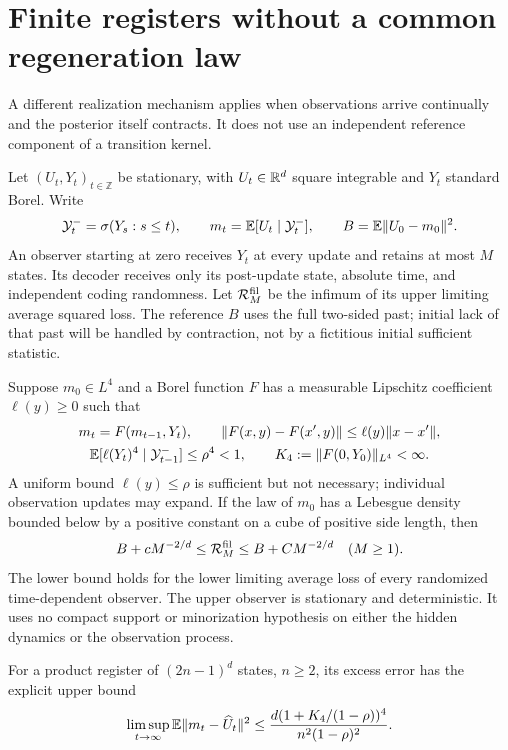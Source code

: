 \section{Finite registers without a common regeneration law}
\label{sec:v6-filter}
A different realization mechanism applies when observations arrive
continually and the posterior itself contracts. It does not use an
independent reference component of a transition kernel.

Let $(U_t,Y_t)_{t\in\mathbb Z}$ be stationary, with $U_t\in\mathbb R^d$ square
integrable and $Y_t$ standard Borel. Write
\[
 \mathcal Y_t^- =\sigma(Y_s:s\le t),\qquad
 m_t=\mathbb E[U_t\mid\mathcal Y_t^-],\qquad
 B=\mathbb E\|U_0-m_0\|^2.
\]
An observer starting at zero receives $Y_t$ at every update and retains
at most $M$ states. Its decoder receives only its post-update state,
absolute time, and independent coding randomness. Let
$\mathcal R_M^{\rm fil}$ be the infimum of its upper limiting average
squared loss. The reference $B$ uses the full two-sided past; initial
lack of that past will be handled by contraction, not by a fictitious
initial sufficient statistic.

\begin{theorem}\label{thm:v6-filter}
Suppose $m_0\in L^4$ and a Borel function $F$ has a measurable
Lipschitz coefficient $\ell(y)\ge0$ such that
\begin{gather}
 m_t=F(m_{t-1},Y_t),\qquad
 \|F(x,y)-F(x',y)\|\le\ell(y)\|x-x'\|,\nonumber\\
 \mathbb E[\ell(Y_t)^4\mid\mathcal Y_{t-1}^-]\le\rho^4<1,
 \qquad K_4:=\|F(0,Y_0)\|_{L^4}<\infty.                 \label{eq:v6-filter-contract}
\end{gather}
A uniform bound $\ell(y)\le\rho$ is sufficient but not necessary;
individual observation updates may expand.
If the law of $m_0$ has a Lebesgue density bounded below by a positive
constant on a cube of positive side length, then
\begin{equation}
 B+cM^{-2/d}\le\mathcal R_M^{\rm fil}\le B+CM^{-2/d}
                       \quad(M\ge1).                   \label{eq:v6-filter-rate}
\end{equation}
The lower bound holds for the lower limiting average loss of every
randomized time-dependent observer. The upper observer is stationary
and deterministic. It uses no compact support or minorization
hypothesis on either the hidden dynamics or the observation process.

For a product register of $(2n-1)^d$ states, $n\ge2$, its excess error
has the explicit upper bound
\begin{equation}
 \limsup_{t\to\infty}\mathbb E\|m_t-\widehat U_t\|^2
 \le \frac{d(1+K_4/(1-\rho))^4}{n^2(1-\rho)^2}.
                                                        \label{eq:v6-filter-constant}
\end{equation}
\end{theorem}

